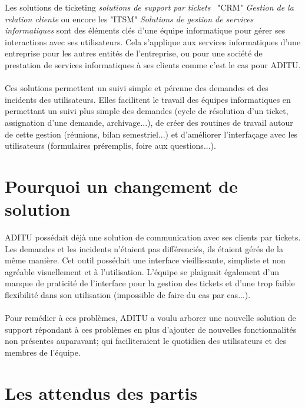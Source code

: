 \renewcommand{\figurename}{}

Les solutions de ticketing \textit{solutions de support par tickets}~ "CRM" \textit{Gestion de la relation cliente} ou encore les "ITSM" \textit{Solutions de gestion de services informatiques} sont des éléments clés d'une équipe informatique pour gérer ses interactions avec ses utilisateurs. Cela s'applique aux services informatiques d'une entreprise pour les autres entités de l'entreprise, ou pour une société de prestation de services informatiques à ses clients comme c'est le cas pour ADITU.
\\ \\
Ces solutions permettent un suivi simple et pérenne des demandes et des incidents des utilisateurs. Elles facilitent le travail des équipes informatiques en permettant un suivi plus simple des demandes (cycle de résolution d'un ticket, assignation d'une demande, archivage...), de créer des routines de travail autour de cette gestion (réunions, bilan semestriel...) et d'améliorer l'interfaçage avec les utilisateurs (formulaires préremplis, foire aux questions...).

\section{Pourquoi un changement de solution}

ADITU possédait déjà une solution de communication avec ses clients par tickets. Les demandes et les incidents n'étaient pas différenciés, ils étaient gérés de la même manière. Cet outil possédait une interface vieillissante, simpliste et non agréable visuellement et à l'utilisation. L'équipe se plaignait également d'un manque de praticité de l'interface pour la gestion des tickets et d'une trop faible flexibilité dans son utilisation (impossible de faire du cas par cas...).
\\ \\
Pour remédier à ces problèmes, ADITU a voulu arborer une nouvelle solution de support répondant à ces problèmes en plus d'ajouter de nouvelles fonctionnalités non présentes auparavant; qui faciliteraient le quotidien des utilisateurs et des membres de l'équipe.

\section{Les attendus des partis}

